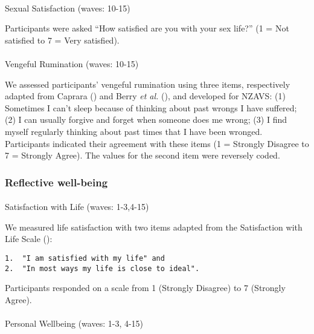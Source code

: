 \documentclass[
  singlecolumn,
  9pt]{scrartcl}
\makeatletter
\let\oldparagraph\paragraph
\renewcommand{\paragraph}{
    \@ifstar
      \xxxParagraphStar
      \xxxParagraphNoStar
  }
\newcommand{\xxxParagraphStar}[1]{\oldparagraph*{#1}\mbox{}}
\newcommand{\xxxParagraphNoStar}[1]{\oldparagraph{#1}\mbox{}}
\makeatother
\begin{document}
\paragraph{Sexual Satisfaction (waves:
10-15)}\label{sexual-satisfaction-waves-10-15}

Participants were asked ``How satisfied are you with your sex life?'' (1
= Not satisfied to 7 = Very satisfied).

\paragraph{Vengeful Rumination (waves:
10-15)}\label{vengeful-rumination-waves-10-15}

We assessed participants' vengeful rumination using three items,
respectively adapted from Caprara
() and Berry \emph{et al.}
(), and developed for
NZAVS: (1) Sometimes I can't sleep because of thinking about past wrongs
I have suffered; (2) I can usually forgive and forget when someone does
me wrong; (3) I find myself regularly thinking about past times that I
have been wronged. Participants indicated their agreement with these
items (1 = Strongly Disagree to 7 = Strongly Agree). The values for the
second item were reversely coded.

\subsubsection{Reflective well-being}\label{reflective-well-being}

\paragraph{Satisfaction with Life (waves:
1-3,4-15)}\label{satisfaction-with-life-waves-1-34-15}

We measured life satisfaction with two items adapted from the
Satisfaction with Life Scale ():

\begin{verbatim}
1.  "I am satisfied with my life" and
2.  "In most ways my life is close to ideal".
\end{verbatim}

Participants responded on a scale from 1 (Strongly Disagree) to 7
(Strongly Agree).

\paragraph{Personal Wellbeing (waves: 1-3,
4-15)}\label{personal-wellbeing-waves-1-3-4-15}
\end{document}
